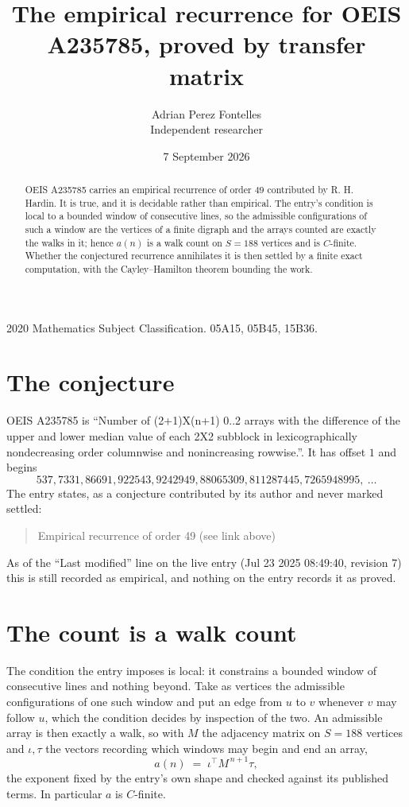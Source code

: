 \documentclass[11pt,a4paper]{article}
\title{The empirical recurrence for OEIS A235785, proved by transfer matrix}
\author{Adrian Perez Fontelles\\ \small Independent researcher}
\date{7 September 2026}
\theoremstyle{plain}
\theoremstyle{definition}
\begin{document}
\maketitle

\begin{abstract}
OEIS A235785 carries an empirical recurrence of order $49$ contributed by R. H. Hardin. It is
true, and it is decidable rather than empirical. The entry's condition is local to a bounded window of consecutive lines, so
the admissible configurations of such a window are the vertices of a finite digraph and the
arrays counted are exactly the walks in it; hence $a(n)$ is a walk count on $S=188$ vertices
and is $C$-finite. Whether the conjectured recurrence annihilates it is then settled by a
finite exact computation, with the Cayley--Hamilton theorem bounding the work.
\end{abstract}

\noindent\small 2020 Mathematics Subject Classification. 05A15, 05B45, 15B36.\normalsize

\section{The conjecture}

OEIS A235785 is ``Number of (2+1)X(n+1) 0..2 arrays with the difference of the upper and lower median value of each 2X2 subblock in lexicographically nondecreasing order columnwise and nonincreasing rowwise.''. It has offset $1$ and begins
\[
537, 7331, 86691, 922543, 9242949, 88065309, 811287445, 7265948995,\ \dots
\]
The entry states, as a conjecture contributed by its author and never marked settled:
\begin{quote}
Empirical recurrence of order 49 (see link above)
\end{quote}
As of the ``Last modified'' line on the live entry (Jul 23 2025 08:49:40, revision 7) this is still
recorded as empirical, and nothing on the entry records it as proved.

\section{The count is a walk count}

The condition the entry imposes is local: it constrains a bounded window of consecutive lines and nothing beyond. Take as
vertices the admissible configurations of one such window and put an edge from $u$ to $v$
whenever $v$ may follow $u$, which the condition decides by inspection of the two. An
admissible array is then exactly a walk, so with $M$ the adjacency matrix on $S=188$ vertices
and $\iota,\tau$ the vectors recording which windows may begin and end an array,
\[
a(n)\;=\;\iota^{\!\top}M^{\,n+1}\tau ,
\]
the exponent fixed by the entry's own shape and checked against its published terms. In
particular $a$ is $C$-finite.
\end{document}
